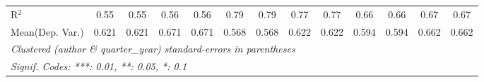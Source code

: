 \begin{tabular}{lcccccccccccc}
   R$^2$                                    & 0.55        & 0.55          & 0.56    & 0.56         & 0.79          & 0.79    & 0.77          & 0.77    & 0.66          & 0.66    & 0.67        & 0.67\\  
Mean(Dep. Var.) & 0.621 & 0.621 & 0.671 & 0.671 & 0.568 & 0.568 & 0.622 & 0.622 & 0.594 & 0.594 & 0.662 & 0.662 \\
   \midrule \midrule
   \multicolumn{13}{l}{\emph{Clustered (author \& quarter\_year) standard-errors in parentheses}}\\
   \multicolumn{13}{l}{\emph{Signif. Codes: ***: 0.01, **: 0.05, *: 0.1}}\\
\end{tabular}
\par\endgroup
